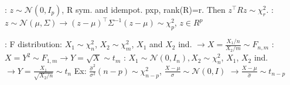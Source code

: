 : $z \sim \mathcal{N}(0, I_p)$, R sym. and idempot. pxp, rank(R)=r. Then $z^{\top}Rz \sim \chi_{r}^{2}$.
:$z \sim \mathcal{N}(\mu, \Sigma) \rightarrow (z-\mu)^{\top}\Sigma^{-1}(z-\mu) \sim \chi_{p}^{2}$, $z \in R^{p}$

: F distribution: $X_{1} \sim \chi_{n}^{2}$, $X_{2} \sim \chi_{m}^{2}$, $X_1$ and $X_2$ ind.
$\rightarrow X = \frac{X_1/n}{X_2/m} \sim F_{n,m}$
: $X=Y^2 \sim F_{1,m} \rightarrow Y = \sqrt {X} \sim t_m$
: $X_1 \sim \mathcal{N}(0, I_n), X_2 \sim \chi_{n}^{2}$, $X_1$, $X_2$ ind.
$\rightarrow Y = \frac{X_1}{\sqrt {X_2/n}} \sim t_n$
Ex: $\frac{\hat{\sigma}^2}{\sigma^2}(n-p) \sim \chi^2_{n-p}$, $\frac{X-\mu}{\sigma} \sim \mathcal{N}(0,I)$
$\rightarrow \frac{X-\mu}{\hat{\sigma}} \sim t_{n-p}$

%
%
%
%
%
